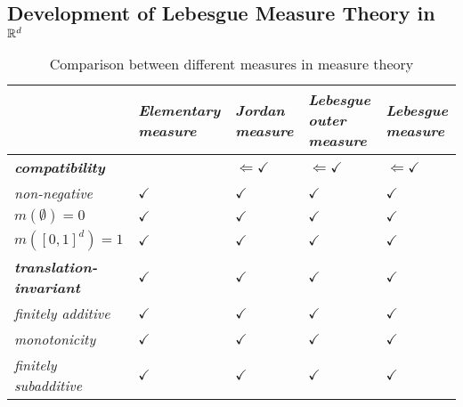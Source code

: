 \documentclass[11pt]{article}
\begin{document}
\subsection{Development of Lebesgue Measure Theory in ${\mathbb R}^d$}
\begin{table}[h!]
\setlength{\abovedisplayskip}{0pt}
\setlength{\belowdisplayskip}{-10pt}
\setlength{\abovedisplayshortskip}{0pt}
\setlength{\belowdisplayshortskip}{0pt}
\footnotesize
\centering
\caption{Comparison between different measures in measure theory}
\label{tab: measure}
\renewcommand\tabularxcolumn[1]{m{#1}}
\small
\begin{tabularx}{1\textwidth} { 
  | >{\raggedright\arraybackslash} m{3cm}
  | >{\centering\arraybackslash}X
  | >{\centering\arraybackslash}X
  | >{\centering\arraybackslash}X
  | >{\centering\arraybackslash}X  | }
 \hline
  &  \emph{\textbf{Elementary measure}} & \emph{\textbf{Jordan measure}}   &  \emph{\textbf{Lebesgue outer measure}}   & \emph{\textbf{Lebesgue measure}} \\
  \hline 
\textbf{\emph{compatibility}}    & & $\Leftarrow \checkmark$  & $\Leftarrow \checkmark$  & $\Leftarrow \checkmark$ \\
 \hline
\emph{non-negative} &  $\checkmark$  & $\checkmark$  & $\checkmark$  & $\checkmark$  \\
 \hline
$m(\emptyset) = 0$  &  $\checkmark$  & $\checkmark$  & $\checkmark$  & $\checkmark$  \\
\hline
$m([0,1]^d) = 1$  &  $\checkmark$  & $\checkmark$  & $\checkmark$  & $\checkmark$  \\
\hline \vspace{5pt}
\emph{\textbf{translation-invariant}}  \vspace{-5pt} &  $\checkmark$  & $\checkmark$  & $\checkmark$  & $\checkmark$ \\
\hline \vspace{5pt}
\emph{finitely additive}   \vspace{2pt}&  $\checkmark$  & $\checkmark$  & $\checkmark$  & $\checkmark$   \\
\hline \vspace{5pt}
\emph{monotonicity}   \vspace{2pt}&  $\checkmark$  & $\checkmark$  & $\checkmark$  & $\checkmark$   \\
\hline \vspace{5pt}
\emph{finitely subadditive}   \vspace{2pt}&  $\checkmark$  & $\checkmark$  & $\checkmark$  & $\checkmark$   \\

\end{tabularx}
\end{table}
\end{document}
